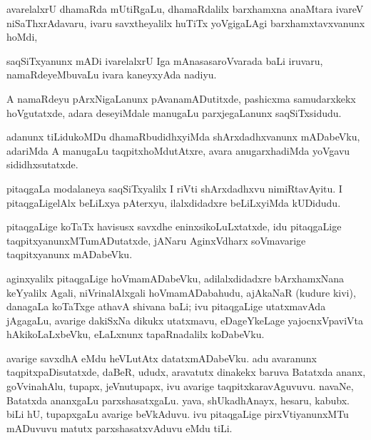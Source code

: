 \documentclass{article}
\begin{document}
\begin{mn}
avarelalxrU dhamaRda mUtiRgaLu, dhamaRdalilx barxhamxna anaMtara
ivareV niSaThxrAdavaru, ivaru savxtheyalilx huTiTx yoVgigaLAgi
barxhamxtavxvanunx hoMdi,
\item 
\end{mn}

\begin{mn}
saqSiTxyanunx mADi ivarelalxrU Iga mAnasasaroVvarada baLi iruvaru,
namaRdeyeMbuvaLu ivara kaneyxyAda nadiyu.
\end{mn}

\begin{mn}
A namaRdeyu pArxNigaLanunx pAvanamADutitxde, pashicxma samudarxkekx
hoVgutatxde, adara deseyiMdale manugaLu parxjegaLanunx saqSiTxsidudu.
\end{mn}

\begin{mn}%
adanunx tiLidukoMDu dhamaRbudidhxyiMda shArxdadhxvanunx mADabeVku,
adariMda A manugaLu taqpitxhoMdutAtxre, avara anugarxhadiMda yoVgavu sididhxsutatxde.
\end{mn}

\begin{mn}%
pitaqgaLa modalaneya saqSiTxyalilx I riVti shArxdadhxvu
nimiRtavAyitu. I pitaqgaLigelAlx beLiLxya pAterxyu, ilalxdidadxre
beLiLxyiMda kUDidudu.
\end{mn}

\begin{mn}%
pitaqgaLige koTaTx havisusx savxdhe eninxsikoLuLxtatxde, idu
pitaqgaLige taqpitxyanunxMTumADutatxde, jANaru AginxVdharx soVmavarige
taqpitxyanunx mADabeVku.
\end{mn}

\begin{mn}%
aginxyalilx pitaqgaLige hoVmamADabeVku, adilalxdidadxre bArxhamxNana
keYyalilx Agali, niVrinalAlxgali hoVmamADabahudu, ajAkaNaR (kudure
kivi), danagaLa koTaTxge athavA shivana baLi; ivu pitaqgaLige
utatxmavAda jAgagaLu, avarige dakiSxNa dikukx utatxmavu, eDageYkeLage
yajocnxVpaviVta hAkikoLaLxbeVku, eLaLxnunx tapaRnadalilx koDabeVku.
\end{mn}

\begin{mn}%
avarige savxdhA eMdu heVLutAtx datatxmADabeVku. adu avaranunx
taqpitxpaDisutatxde, daBeR, ududx, aravatutx dinakekx baruva Batatxda
ananx, goVvinahAlu, tupapx, jeVnutupapx, ivu avarige
taqpitxkaravAguvuvu. navaNe, Batatxda ananxgaLu parxshasatxgaLu. yava,
shUkadhAnayx, hesaru, kabubx. biLi hU, tupapxgaLu avarige
beVkAduvu. ivu pitaqgaLige pirxVtiyanunxMTu mADuvuvu matutx
parxshasatxvAduvu eMdu tiLi.
\end{mn}
\end{document}
